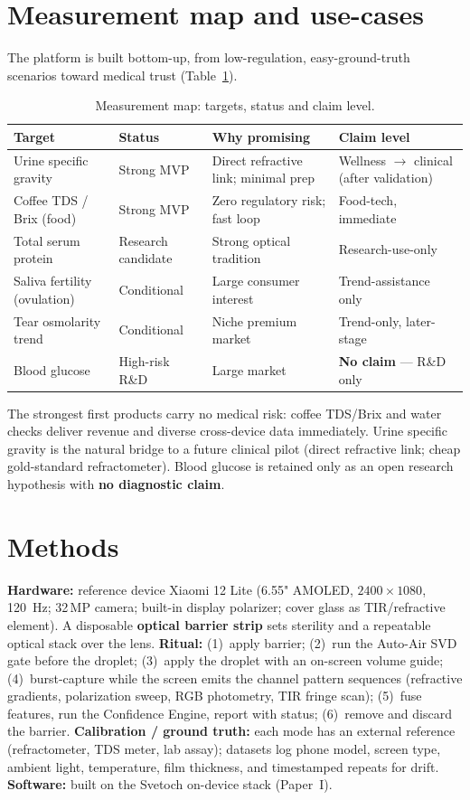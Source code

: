\documentclass[11pt]{article}
\begin{document}
\section{Measurement map and use-cases}
The platform is built bottom-up, from low-regulation, easy-ground-truth scenarios toward
medical trust (Table~\ref{tab:map}).

\begin{table}[ht]\centering\small
\caption{Measurement map: targets, status and claim level.}
\label{tab:map}
\begin{tabular}{llll}
\toprule
Target & Status & Why promising & Claim level\\
\midrule
Urine specific gravity & Strong MVP & Direct refractive link; minimal prep & Wellness $\to$ clinical (after validation)\\
Coffee TDS / Brix (food) & Strong MVP & Zero regulatory risk; fast loop & Food-tech, immediate\\
Total serum protein & Research candidate & Strong optical tradition & Research-use-only\\
Saliva fertility (ovulation) & Conditional & Large consumer interest & Trend-assistance only\\
Tear osmolarity trend & Conditional & Niche premium market & Trend-only, later-stage\\
Blood glucose & High-risk R\&D & Large market & \textbf{No claim} --- R\&D only\\
\bottomrule
\end{tabular}
\end{table}

The strongest first products carry no medical risk: coffee TDS/Brix and water checks deliver
revenue and diverse cross-device data immediately. Urine specific gravity is the natural bridge
to a future clinical pilot (direct refractive link; cheap gold-standard refractometer). Blood
glucose is retained only as an open research hypothesis with \textbf{no diagnostic claim}.

\section{Methods}
\textbf{Hardware:} reference device Xiaomi 12 Lite (6.55" AMOLED, $2400\times1080$,
\SI{120}{\hertz}; 32\,MP camera; built-in display polarizer; cover glass as TIR/refractive
element). A disposable \textbf{optical barrier strip} sets sterility and a repeatable optical
stack over the lens. \textbf{Ritual:} (1)~apply barrier; (2)~run the Auto-Air SVD gate before
the droplet; (3)~apply the droplet with an on-screen volume guide; (4)~burst-capture while the
screen emits the channel pattern sequences (refractive gradients, polarization sweep, RGB
photometry, TIR fringe scan); (5)~fuse features, run the Confidence Engine, report with status;
(6)~remove and discard the barrier. \textbf{Calibration / ground truth:} each mode has an
external reference (refractometer, TDS meter, lab assay); datasets log phone model, screen type,
ambient light, temperature, film thickness, and timestamped repeats for drift. \textbf{Software:}
built on the Svetoch on-device stack (Paper~I).
\end{document}
